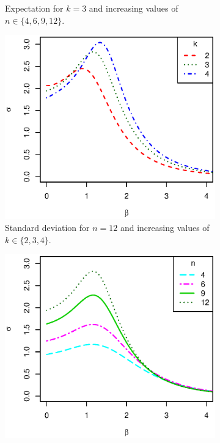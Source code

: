 \documentclass[nojss,shortnames]{jss}\usepackage[]{graphicx}\usepackage[]{color}
\begin{document}
\begin{figure}
\begin{subfigure}{0.45\textwidth}
                \caption{Expectation for $k=3$ and increasing values of $n \in \{4, 6, 9, 12\}$.}
                \label{f:exact_exp_n}
        \end{subfigure}%
\qquad
        \begin{subfigure}{0.45\textwidth}
                \includegraphics[width=\textwidth]{exact_var_k.eps}
                \caption{Standard deviation for $n=12$ and increasing values of $k \in \{2, 3, 4\}$.}
                \label{f:exact_var_k}
        \end{subfigure}%
\qquad
        \begin{subfigure}{0.45\textwidth}
                \includegraphics[width=\textwidth]{exact_var_n.eps}

\end{subfigure}
\end{figure}
\end{document}
